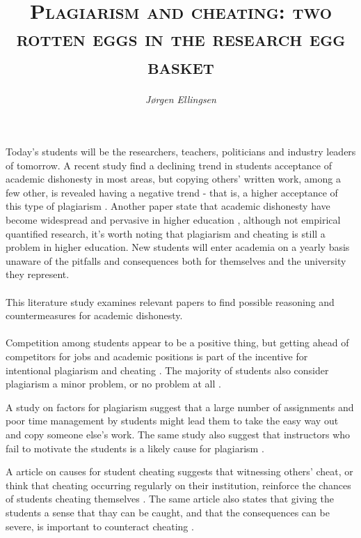 \documentclass[12pt,a4paper]{article}
\author{\textit{Jørgen Ellingsen}}
\title{\textsc{Plagiarism and cheating: two rotten eggs in the research egg basket}}
\begin{document}
\maketitle
\date{}

Today's students will be the researchers, teachers, politicians and industry leaders of tomorrow. A recent study find a declining trend in students acceptance of academic dishonesty in most areas, but copying others' written work, among a few other, is revealed having a negative trend - that is, a higher acceptance of this type of plagiarism \cite{Molnar2015}. Another paper state that academic dishonesty have become widespread and pervasive in higher education \cite{Dalal2015}, although not empirical quantified research, it's worth noting that plagiarism and cheating is still a problem in higher education. New students will enter academia on a yearly basis unaware of the pitfalls and consequences both for themselves and the university they represent. 
\\ \\ %
This literature study examines relevant papers to find possible reasoning and countermeasures for academic dishonesty. 
\\ \\ %
Competition among students appear to be a positive thing, but getting ahead of competitors for jobs and academic positions is part of the incentive for intentional plagiarism and cheating \cite{Teixeira2010}. The  majority of students also consider plagiarism a minor problem, or no problem at all \cite{Teixeira2010}.

A study on factors for plagiarism suggest that a large number of assignments and poor time management by students might lead them to take the easy way out and copy someone else's work. The same study also suggest that instructors who fail to motivate the students is a likely cause for plagiarism \cite{Comas2010}.

A article on causes for student cheating suggests that witnessing others' cheat, or think that cheating occurring regularly on their institution, reinforce the chances of students cheating themselves \cite{Rettinger2009}. The same article also states that giving the students a sense that thay can be caught, and that the consequences can be severe, is important to counteract cheating \cite{Rettinger2009}.
\end{document}
